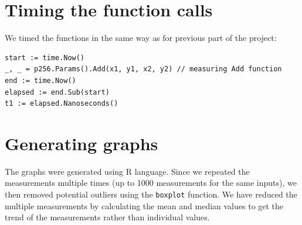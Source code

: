 \documentclass[a4paper]{scrartcl}
\begin{document}

\section{Timing the function calls}

We timed the functions in the same way as for previous part of the project:
\begin{lstlisting}[language=golang]
start := time.Now()
_, _ = p256.Params().Add(x1, y1, x2, y2) // measuring Add function
end := time.Now()
elapsed := end.Sub(start)
t1 := elapsed.Nanoseconds()
\end{lstlisting}

\section{Generating graphs}
The graphs were generated using R language. Since we repeated the measurements multiple times (up to 1000 measurements for the same inputs), we then removed potential outliers using the \verb+boxplot+ function. We have reduced the multiple measurements by calculating the mean and median values to get the trend of the measurements rather than individual values.
\end{document}
